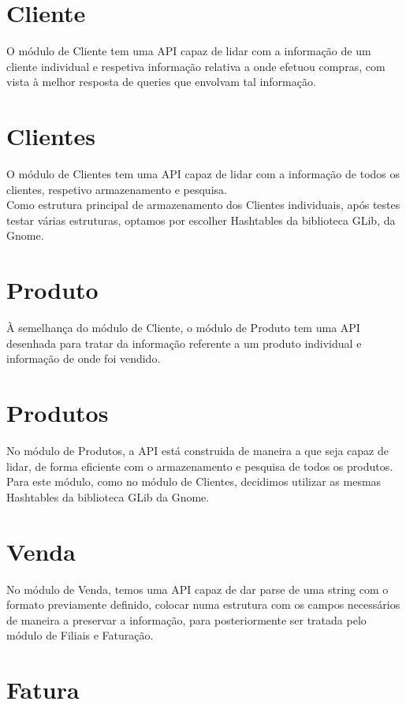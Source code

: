 \documentclass[a4paper]{report}
\begin{document}
\section{Cliente}

O módulo de Cliente tem uma API capaz de lidar com a informação de um cliente
individual e respetiva informação relativa a onde efetuou compras, com vista
à melhor resposta de queries que envolvam tal informação.

\section{Clientes}

O módulo de Clientes tem uma API capaz de lidar com a informação de todos os
clientes, respetivo armazenamento e pesquisa. \\ 
Como estrutura principal de armazenamento dos Clientes individuais, após testes 
testar várias estruturas, optamos por escolher Hashtables da biblioteca GLib, 
da Gnome.

\section{Produto}

À semelhança do módulo de Cliente, o módulo de Produto tem uma API desenhada
para tratar da informação referente a um produto individual e informação de 
onde foi vendido.

\section{Produtos}

No módulo de Produtos, a API está construida de maneira a que seja capaz de
lidar, de forma eficiente com o armazenamento e pesquisa de todos os produtos.\\
Para este módulo, como no módulo de Clientes, decidimos utilizar as mesmas Hashtables
da biblioteca GLib da Gnome.

\section{Venda}

No módulo de Venda, temos uma API capaz de dar parse de uma string com o formato 
previamente definido, colocar numa estrutura com os campos necessários de maneira
a preservar a informação, para posteriormente ser tratada pelo módulo de Filiais e
Faturação.

\section{Fatura}
\end{document}

